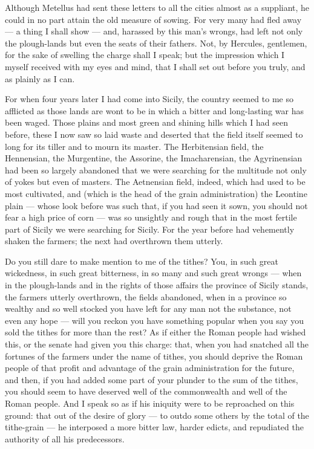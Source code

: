  Although Metellus had sent these letters to all the cities almost as a suppliant, he could in no part attain the old measure of sowing. For very many had fled away --- a thing I shall show --- and, harassed by this man's wrongs, had left not only the plough-lands but even the seats of their fathers. Not, by Hercules, gentlemen, for the sake of swelling the charge shall I speak; but the impression which I myself received with my eyes and mind, that I shall set out before you truly, and as plainly as I can.

 For when four years later I had come into Sicily, the country seemed to me so afflicted as those lands are wont to be in which a bitter and long-lasting war has been waged. Those plains and most green and shining hills which I had seen before, these I now saw so laid waste and deserted that the field itself seemed to long for its tiller and to mourn its master. The Herbitensian field, the Hennensian, the Murgentine, the Assorine, the Imacharensian, the Agyrinensian had been so largely abandoned that we were searching for the multitude not only of yokes but even of masters. The Aetnensian field, indeed, which had used to be most cultivated, and (which is the head of the grain administration) the Leontine plain --- whose look before was such that, if you had seen it sown, you should not fear a high price of corn --- was so unsightly and rough that in the most fertile part of Sicily we were searching for Sicily. For the year before had vehemently shaken the farmers; the next had overthrown them utterly.

 Do you still dare to make mention to me of the tithes? You, in such great wickedness, in such great bitterness, in so many and such great wrongs --- when in the plough-lands and in the rights of those affairs the province of Sicily stands, the farmers utterly overthrown, the fields abandoned, when in a province so wealthy and so well stocked you have left for any man not the substance, not even any hope --- will you reckon you have something popular when you say you sold the tithes for more than the rest? As if either the Roman people had wished this, or the senate had given you this charge: that, when you had snatched all the fortunes of the farmers under the name of tithes, you should deprive the Roman people of that profit and advantage of the grain administration for the future, and then, if you had added some part of your plunder to the sum of the tithes, you should seem to have deserved well of the commonwealth and well of the Roman people. And I speak so as if his iniquity were to be reproached on this ground: that out of the desire of glory --- to outdo some others by the total of the tithe-grain --- he interposed a more bitter law, harder edicts, and repudiated the authority of all his predecessors.

